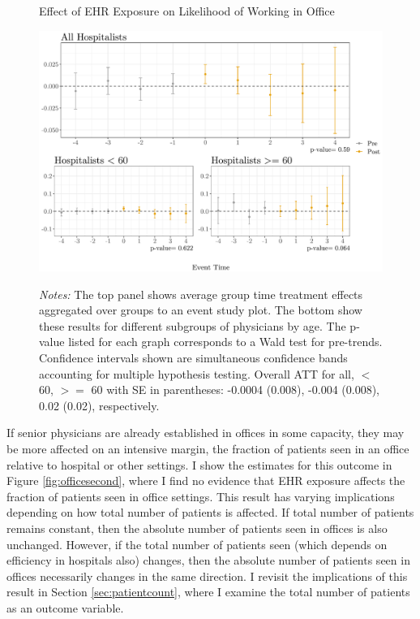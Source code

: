 \documentclass[11pt]{article}
\begin{document}
\begin{figure}[ht]
    \centering
    \caption{Effect of EHR Exposure on Likelihood of Working in Office}
    \includegraphics[scale=.65]{Objects/officeind_plot.pdf}
    \label{fig:officefirst}
    \vspace{2mm}
    \caption*{\footnotesize{\textit{Notes:} The top panel shows average group time treatment effects aggregated over groups to an event study plot. The bottom show these results for different subgroups of physicians by age. The p-value listed for each graph corresponds to a Wald test for pre-trends. Confidence intervals shown are simultaneous confidence bands accounting for multiple hypothesis testing. Overall ATT for all, $<$ 60, $>=$ 60 with SE in parentheses: -0.0004 (0.008), -0.004 (0.008), 0.02 (0.02), respectively.}}
\end{figure}

If senior physicians are already established in offices in some capacity, they may be more affected on an intensive margin, the fraction of patients seen in an office relative to hospital or other settings. I show the estimates for this outcome in Figure \ref{fig:officesecond}, where I find no evidence that EHR exposure affects the fraction of patients seen in office settings. This result has varying implications depending on how total number of patients is affected. If total number of patients remains constant, then the absolute number of patients seen in offices is also unchanged. However, if the total number of patients seen (which depends on efficiency in hospitals also) changes, then the absolute number of patients seen in offices necessarily changes in the same direction. I revisit the implications of this result in Section \ref{sec:patientcount}, where I examine the total number of patients as an outcome variable.
\end{document}
